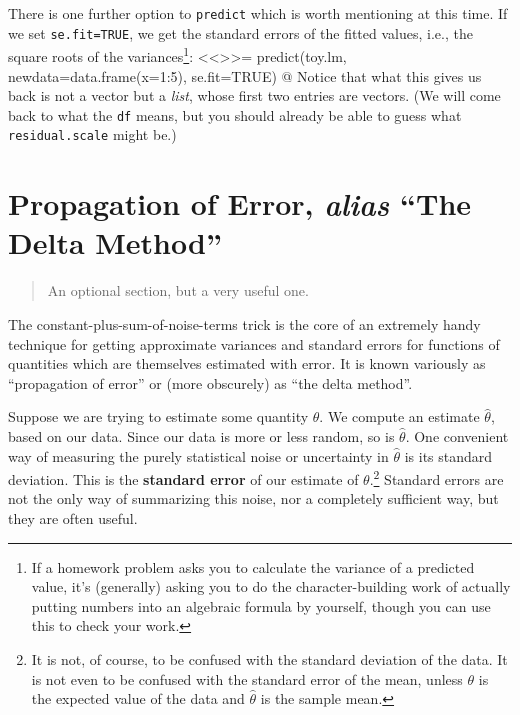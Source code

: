 \documentclass{article}
\begin{document}
There is one further option to \texttt{predict} which is worth mentioning at
this time.  If we set \texttt{se.fit=TRUE}, we get the standard errors of the
fitted values, i.e., the square roots of the variances\footnote{If a homework
  problem asks you to calculate the variance of a predicted value, it's
  (generally) asking you to do the character-building work of actually putting
  numbers into an algebraic formula by yourself, though you can use this to
  check your work.}:
<<>>=
predict(toy.lm, newdata=data.frame(x=1:5), se.fit=TRUE)
@
Notice that what this gives us back is not a vector but a {\em list}, whose
first two entries are vectors.  (We will come back to what the \texttt{df}
means, but you should already be able to guess what \texttt{residual.scale}
might be.)



\section{Propagation of Error, {\em alias} ``The Delta Method''}
\label{sec:propagation-of-error}

\begin{quotation}
An optional section, but a very useful one.
\end{quotation}

The constant-plus-sum-of-noise-terms trick is the core of an extremely handy
technique for getting approximate variances and standard errors for functions
of quantities which are themselves estimated with error.  It is known variously
as ``propagation of error'' or (more obscurely) as ``the delta method''.

Suppose we are trying to estimate some quantity $\theta$.  We compute an
estimate $\widehat{\theta}$, based on our data.  Since our data is more or less
random, so is $\widehat{\theta}$.  One convenient way of measuring the purely
statistical noise or uncertainty in $\widehat{\theta}$ is its standard
deviation.  This is the {\bf standard error} of our estimate of
$\theta$.\footnote{It is not, of course, to be confused with the standard
  deviation of the data.  It is not even to be confused with the standard error
  of the mean, unless $\theta$ is the expected value of the data and
  $\widehat{\theta}$ is the sample mean.}  Standard errors are not the only way
of summarizing this noise, nor a completely sufficient way, but they are often
useful.
\end{document}
